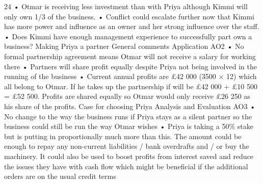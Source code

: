 \documentclass{article}
\begin{document}
24 \newline
• Otmar is receiving less investment than with Priya although Kimmi will only own 1/3 of the business. \newline
• Conflict could escalate further now that Kimmi has more power and influence as an owner and her \newline
strong influence over the staff. \newline
• Does Kimmi have enough management experience to successfully part own a business? \newline
 \newline
Making Priya a partner \newline
 \newline
General comments \newline
 \newline
Application AO2 \newline
• No formal partnership agreement means Otmar will not receive a salary for working there \newline
• Partners will share profit equally despite Priya not being involved in the running of the business \newline
• Current annual profits are £42 000 (3500 × 12) which all belong to Otmar.  If he takes up the \newline
partnership if will be £42 000 + £10 500 = £52 500.  Profits are shared equally so Otmar would only \newline
receive £26 250 as his share of the profits. \newline
  \newline
Case for choosing Priya \newline
 \newline
Analysis and Evaluation AO3 \newline
• No change to the way the business runs if Priya stays as a silent partner so the business could still be \newline
run the way Otmar wishes \newline
• Priya is taking a 50\% stake but is putting in proportionally much more than this.  The amount could be \newline
enough to repay any non-current liabilities / bank overdrafts and / or buy the machinery.  It could also \newline
be used to boost profits from interest saved and reduce the issues they have with cash flow which \newline
might be beneficial if the additional orders are on the usual credit terms \newline
\end{document}
